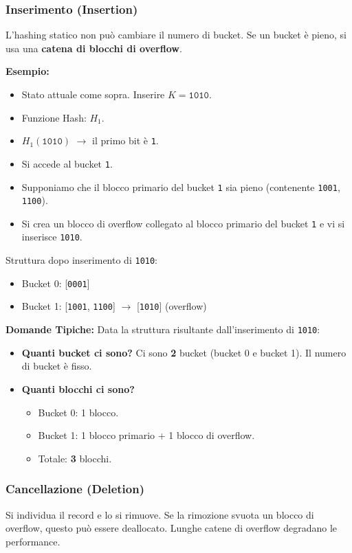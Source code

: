 \subsubsection{Inserimento (Insertion)}
L'hashing statico non può cambiare il numero di bucket. Se un bucket è pieno, si usa una \textbf{catena di blocchi di overflow}.

\textbf{Esempio:}
\begin{itemize}
    \item Stato attuale come sopra. Inserire $K = \texttt{1010}$.
    \item Funzione Hash: $H_1$.
    \item $H_1(\texttt{1010})$ $\rightarrow$ il primo bit è \texttt{1}.
    \item Si accede al bucket \texttt{1}.
    \item Supponiamo che il blocco primario del bucket \texttt{1} sia pieno (contenente \texttt{1001}, \texttt{1100}).
    \item Si crea un blocco di overflow collegato al blocco primario del bucket \texttt{1} e vi si inserisce \texttt{1010}.
\end{itemize}
Struttura dopo inserimento di \texttt{1010}:
\begin{itemize}
    \item Bucket 0: [\texttt{0001}]
    \item Bucket 1: [\texttt{1001}, \texttt{1100}] $\rightarrow$ [\texttt{1010}] (overflow)
\end{itemize}

\textbf{Domande Tipiche:}
Data la struttura risultante dall'inserimento di \texttt{1010}:
\begin{itemize}
    \item \textbf{Quanti bucket ci sono?} Ci sono \textbf{2} bucket (bucket 0 e bucket 1). Il numero di bucket è fisso.
    \item \textbf{Quanti blocchi ci sono?}
    \begin{itemize}
        \item Bucket 0: 1 blocco.
        \item Bucket 1: 1 blocco primario + 1 blocco di overflow.
        \item Totale: \textbf{3} blocchi.
    \end{itemize}
\end{itemize}

\subsubsection{Cancellazione (Deletion)}
Si individua il record e lo si rimuove. Se la rimozione svuota un blocco di overflow, questo può essere deallocato. Lunghe catene di overflow degradano le performance.

